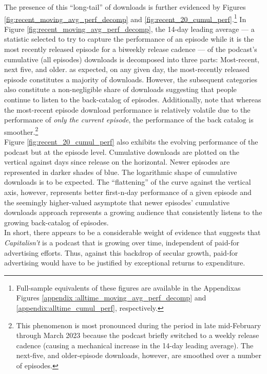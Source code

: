 \documentclass[11pt, letterpaper, twoside]{article}
\begin{document}
The presence of this ``long-tail'' of downloads is further evidenced by Figures \ref{fig:recent_moving_avg_perf_decomp} and \ref{fig:recent_20_cumul_perf}.\footnote{Full-sample equivalents of these figures are available in the Appendixas Figures \ref{appendix :alltime_moving_avg_perf_decomp} and \ref{appendix:alltime_cumul_perf}, respectively.} In Figure \ref{fig:recent_moving_avg_perf_decomp}, the 14-day leading average --- a statistic selected to try to capture the performance of an episode while it is the most recently released episode for a biweekly release cadence --- of the podcast's cumulative (all episodes) downloads is decomposed into three parts: Most-recent, next five, and older. as expected, on any given day, the most-recently released episode constitutes a majority of downloads. However, the subsequent categories also constitute a non-negligible share of downloads suggesting that people continue to listen to the back-catalog of episodes. Additionally, note that whereas the most-recent episode download performance is relatively volatile due to the performance of \textit{only the current episode}, the performance of the back catalog is smoother.\footnote{This phenomenon is most pronounced during the period in late mid-February through March 2023 because the podcast briefly switched to a weekly release cadence (causing a mechanical increase in the 14-day leading average). The next-five, and older-episode downloads, however, are smoothed over a number of episodes.}\\

Figure \ref{fig:recent_20_cumul_perf} also exhibits the evolving performance of the podcast but at the episode level. Cumulative downloads are plotted on the vertical against days since release on the horizontal. Newer episodes are represented in darker shades of blue. The logarithmic shape of cumulative downloads is to be expected. The ``flattening'' of the curve against the vertical axis, however, represents better first-n-day performance of a given episode and the seemingly higher-valued asymptote that newer episodes' cumulative downloads approach represents a growing audience that consistently listens to the growing back-catalog of episodes.\\

In short, there appears to be a considerable weight of evidence that suggests that \textit{Capitalisn't} is a podcast that is growing over time, independent of paid-for advertising efforts. Thus, against this backdrop of secular growth, paid-for advertising would have to be justified by exceptional returns to expenditure.
\end{document}
